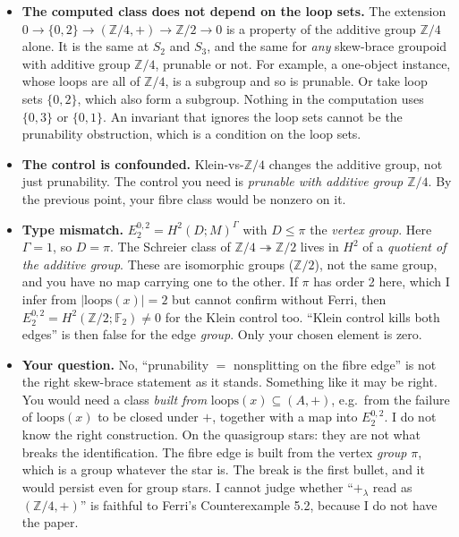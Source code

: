 \documentclass[11pt]{article}
\begin{document}
\begin{itemize}
\item \textbf{The computed class does not depend on the loop sets.} The extension
  $0\to\{0,2\}\to(\mathbb Z/4,+)\to\mathbb Z/2\to0$ is a property of the additive group $\mathbb Z/4$ alone. It is
  the same at $S_2$ and $S_3$, and the same for \emph{any} skew-brace groupoid with additive group $\mathbb Z/4$,
  prunable or not. For example, a one-object instance, whose loops are all of $\mathbb Z/4$, is a subgroup and so
  is prunable. Or take loop sets $\{0,2\}$, which also form a subgroup. Nothing in the computation uses $\{0,3\}$ or $\{0,1\}$. An
  invariant that ignores the loop sets cannot be the prunability obstruction, which is a condition on the loop sets.
\item \textbf{The control is confounded.} Klein-vs-$\mathbb Z/4$ changes the additive group, not just prunability. The
  control you need is \emph{prunable with additive group $\mathbb Z/4$}. By the previous point, your fibre class would be
  nonzero on it.
\item \textbf{Type mismatch.} $E_2^{0,2}=H^2(D;M)^\Gamma$ with $D\le\pi$ the \emph{vertex group}. Here
  $\Gamma=1$, so $D=\pi$. The Schreier class of $\mathbb Z/4\twoheadrightarrow\mathbb Z/2$ lives in $H^2$ of a
  \emph{quotient of the additive group}. These are isomorphic groups ($\mathbb Z/2$), not the same group, and
  you have no map carrying one to the other. If $\pi$ has order 2 here, which I infer from $|\mathrm{loops}(x)|=2$
  but cannot confirm without Ferri, then $E_2^{0,2}=H^2(\mathbb Z/2;\mathbb F_2)\ne0$ for the Klein control too.
  ``Klein control kills both edges'' is then false for the edge \emph{group}. Only your chosen element is zero.
\item \textbf{Your question.} No, ``prunability $=$ nonsplitting on the fibre edge'' is not the right skew-brace
  statement as it stands. Something like it may be right. You would need a class \emph{built from} $\mathrm{loops}(x)\subseteq(A,+)$, e.g.\ from the
  failure of $\mathrm{loops}(x)$ to be closed under $+$, together with a map into $E_2^{0,2}$. I do not know
  the right construction. On the quasigroup stars: they are not what breaks the identification. The fibre edge
  is built from the vertex \emph{group} $\pi$, which is a group whatever the star is. The break is the first
  bullet, and it would persist even for group stars. I cannot judge whether ``$+_\lambda$ read as $(\mathbb Z/4,+)$''
  is faithful to Ferri's Counterexample 5.2, because I do not have the paper.
\end{itemize}
\end{document}
